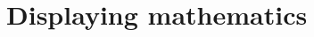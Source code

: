 \documentclass[preprint2]{aastex63}
\begin{document}
%
%
%


\section{Displaying mathematics} \label{sec:displaymath}
\end{document}
